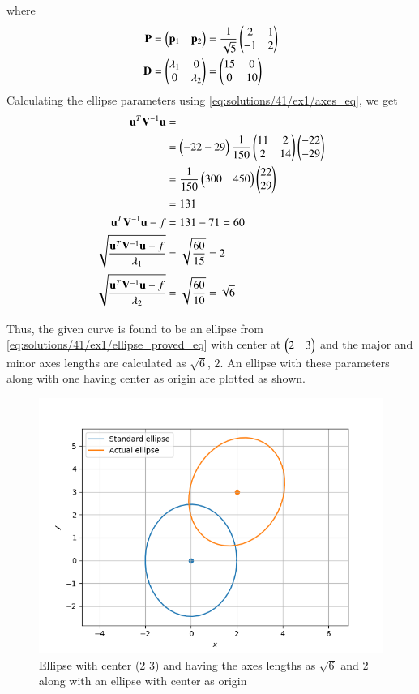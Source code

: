 where 
\begin{align}
\mathbf{P} & =\begin{pmatrix}\mathbf{p}_1 & \mathbf{p}_2\end{pmatrix} = \frac{1}{\sqrt{5}}\begin{pmatrix}2 & 1\\ -1 & 2\end{pmatrix} \label{eq:solutions/41/ex1/ellipse_spectrum_P_eq}
\\
 \mathbf{D} &= \begin{pmatrix}\lambda_1 & 0 \\ 0 & \lambda_2\end{pmatrix} =\begin{pmatrix}15 & 0\\ 0 & 10\end{pmatrix}
\label{eq:solutions/41/ex1/eq:ellipse_spectrum_D}
\end{align}
Calculating the ellipse parameters using \eqref{eq:solutions/41/ex1/axes_eq}, we get
\begin{align}
\mathbf{u}^T\mathbf{V}^{-1}\mathbf{u} &= \nonumber \\
&= \begin{pmatrix}-22 -29\end{pmatrix}\frac{1}{150}\begin{pmatrix}11 & 2 \\ 2 &1 4 \end{pmatrix}\begin{pmatrix}-22 \\ -29\end{pmatrix} \nonumber \\
&= \frac{1}{150}\begin{pmatrix}300 & 450\end{pmatrix}\begin{pmatrix}22 \\ 29\end{pmatrix} \nonumber \\
&= 131 \nonumber \\
\mathbf{u}^T\mathbf{V}^{-1}\mathbf{u} -f &= 131 - 71 = 60 \\
\sqrt{\frac{\mathbf{u}^T\mathbf{V}^{-1}\mathbf{u} -f}{\lambda_1}} &= \sqrt{\frac{60}{15}} = 2 \\
\sqrt{\frac{\mathbf{u}^T\mathbf{V}^{-1}\mathbf{u} -f}{\lambda_2}} &= \sqrt{\frac{60}{10}} = \sqrt{6}
\end{align}

Thus, the given curve is found to be an ellipse from \eqref{eq:solutions/41/ex1/ellipse_proved_eq} with center at $\begin{pmatrix}2 & 3\end{pmatrix}$ and the major and minor axes lengths are calculated as $\sqrt{6}$, $2$. An ellipse with these parameters along with one having center as origin are plotted as shown.

\begin{figure}[!ht]
\centering
\includegraphics[width=\columnwidth]{./solutions/41/ex1/assignment_6_figure.png}
\caption{Ellipse with center (2 3) and having the axes lengths as $\sqrt{6}$ and 2 along with an ellipse with center as origin}
\label{eq:solutions/41/ex1/Fig:Ellipse}
\end{figure}
